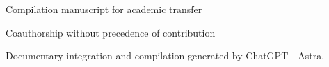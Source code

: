 \thispagestyle{plain}
\begin{center}
{\fontsize{10}{12}\selectfont Compilation manuscript for academic transfer\par}
\vspace{6mm}
{\fontsize{17}{20.5}\selectfont\bfseries\Titulo\par}
\vspace{8pt}
{\fontsize{13}{16}\selectfont\bfseries\TituloSegundo\par}
\vspace{11pt}
{\fontsize{11.5}{14}\selectfont\Autores\par}
\vspace{4pt}
{\fontsize{8}{10}\selectfont Coauthorship without precedence of contribution\par}
\vspace{3pt}
{\fontsize{8}{10}\selectfont Documentary integration and compilation generated by ChatGPT - Astra.\par}
\end{center}
\vspace{7pt}
